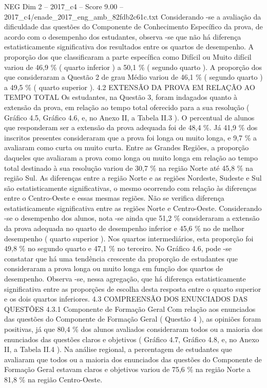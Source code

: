 \begin{textsample}{NEG Dim 2 – 2017\_c4 – Score 9.00 – 2017\_c4/enade\_2017\_eng\_amb\_82fdb2c61c.txt}
Considerando -se a avaliação da dificuldade das questões do Componente de Conhecimento Específico da prova, de acordo com o desempenho dos estudantes, observa -se que não há diferença estatisticamente significativa dos resultados entre os quartos de desempenho.
A proporção dos que classificaram a parte específica como Difícil ou Muito difícil variou de 46,9 \% ( quarto inferior ) a 50,1 \% ( segundo quarto ).
A proporção dos que consideraram a Questão 2 de grau Médio variou de 46,1 \% ( segundo quarto ) a 49,5 \% ( quarto superior ). 4.2 EXTENSÃO DA PROVA EM RELAÇÃO AO TEMPO TOTAL Os estudantes, na Questão 3, foram indagados quanto à extensão da prova, em relação ao tempo total oferecido para a sua resolução ( Gráfico 4.5, Gráfico 4.6, e, no Anexo II, a Tabela II.3 ).
O percentual de alunos que responderam ser a extensão da prova adequada foi de 48,4 \%.
Já 41,9 \% dos inscritos presentes consideraram que a prova foi longa ou muito longa, e 9,7 \% a avaliaram como curta ou muito curta.
Entre as Grandes Regiões, a proporção daqueles que avaliaram a prova como longa ou muito longa em relação ao tempo total destinado à sua resolução variou de 30,7 \% na região Norte até 45,8 \% na região Sul.
As diferenças entre a região Norte e as regiões Nordeste, Sudeste e Sul são estatisticamente significativas, o mesmo ocorrendo com relação às diferenças entre o Centro-Oeste e essas mesmas regiões.
Não se verifica diferença estatisticamente significativa entre as regiões Norte e Centro-Oeste.
Considerando -se o desempenho dos alunos, nota -se ainda que 51,2 \% consideraram a extensão da prova adequada no quarto de desempenho inferior e 45,6 \% no de melhor desempenho ( quarto superior ).
Nos quartos intermediários, esta proporção foi 49,8 \% no segundo quarto e 47,1 \% no terceiro.
No Gráfico 4.6, pode -se constatar que há uma tendência crescente da proporção de estudantes que consideraram a prova longa ou muito longa em função dos quartos de desempenho.
Observa -se, nessa agregação, que há diferença estatisticamente significativa entre as proporções de escolha desta resposta entre o quarto superior e os dois quartos inferiores. 4.3 COMPREENSÃO DOS ENUNCIADOS DAS QUESTÕES 4.3.1 Componente de Formação Geral Com relação aos enunciados das questões do Componente de Formação Geral ( Questão 4 ), as opiniões foram positivas, já que 80,4 \% dos alunos avaliados consideraram todos ou a maioria dos enunciados das questões claros e objetivos ( Gráfico 4.7, Gráfico 4.8, e, no Anexo II, a Tabela II.4 ).
Na análise regional, a percentagem de estudantes que avaliaram que todos ou a maioria dos enunciados das questões do Componente de Formação Geral estavam claros e objetivos variou de 75,6 \% na região Norte a 81,8 \% na região Centro-Oeste.

\end{textsample}
